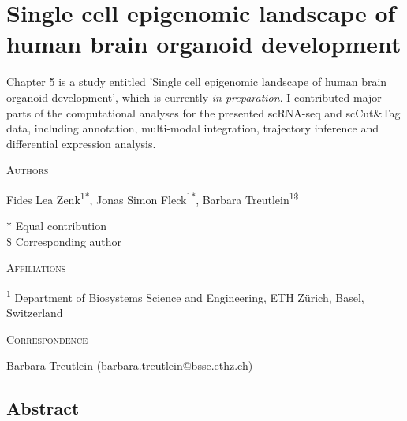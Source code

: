 \thispagestyle{plain}
\section{Single cell epigenomic landscape of human brain organoid development}

\vspace{0.5cm}

Chapter 5 is a study entitled 'Single cell epigenomic landscape of human brain organoid development', which is currently \textit{in preparation}. I contributed major parts of the computational analyses for the presented scRNA-seq and scCut\&Tag data, including annotation, multi-modal integration, trajectory inference and differential expression analysis.

\vspace{1cm}

\noindent
{\large\textsc{Authors}}

\noindent
Fides Lea Zenk\textsuperscript{1$*$}, 
Jonas Simon Fleck\textsuperscript{1$*$}, 
Barbara Treutlein\textsuperscript{1\$}

\vspace{0.5cm}

\noindent
$\ast$ Equal contribution\\
\$ Corresponding author

\vspace{1cm}

\noindent
{\large\textsc{Affiliations}}

\noindent
\textsuperscript{1} Department of Biosystems Science and Engineering, ETH Zürich, Basel, Switzerland\\

\vspace{1cm}

\noindent
{\large\textsc{Correspondence}} 

\noindent
Barbara Treutlein (\href{mailto:barbara.treutlein@bsse.ethz.ch}{barbara.treutlein@bsse.ethz.ch})

\vspace{1cm}

\clearpage


\subsection{Abstract}

